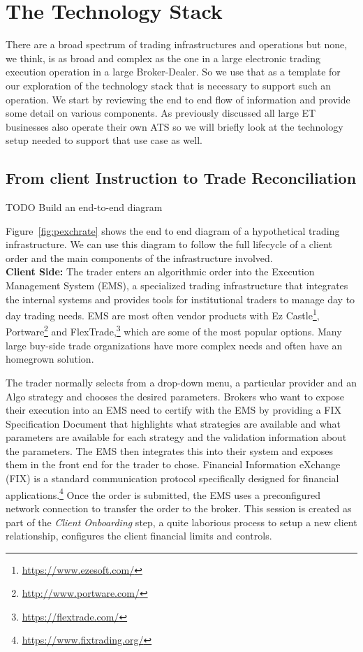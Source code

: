 \chapter{The Technology Stack\label{chap:ch_tech}}

There are a broad spectrum of trading infrastructures and operations but none, we think, is as broad and complex as the one in a large electronic trading execution operation in a large Broker-Dealer. So we use that as a template for our exploration of the technology stack that is necessary to support such an operation. We start by reviewing the end to end flow of information and provide some detail on various components. As previously discussed all large ET businesses also operate their own ATS so we will briefly look at the technology setup needed to support that use case as well.


\section{From client Instruction to Trade Reconciliation}

TODO Build an end-to-end diagram


Figure~\ref{fig:pexchrate} shows the end to end diagram of a hypothetical trading infrastructure. We can use this diagram to follow the full lifecycle of a client order and the main components of the infrastructure involved. \\


\noindent\textbf{Client Side:} The trader enters an algorithmic order into the Execution Management System (EMS), a specialized trading infrastructure that integrates the internal systems and provides tools for institutional traders to manage day to day trading needs. EMS are most often vendor products with Ez Castle\footnote{\url{https://www.ezesoft.com/}}, Portware\footnote{\url{http://www.portware.com/}} and FlexTrade,\footnote{\url{https://flextrade.com/}} which are some of the most popular options. Many large buy-side trade organizations have more complex needs and often have an homegrown solution.


The trader normally selects from a drop-down menu, a particular provider and an Algo strategy and  chooses the desired parameters. Brokers who want to expose their execution into an EMS need to certify with the EMS by providing a FIX Specification Document that highlights what strategies are available and what parameters are available for each strategy and the validation information about the parameters. The EMS then integrates this into their system and exposes them in the front end for the trader to chose. Financial Information eXchange (FIX) is a standard communication protocol specifically designed for financial applications.\footnote{\url{https://www.fixtrading.org/}} Once the order is submitted, the EMS uses a preconfigured network connection to transfer the order to the broker. This session is created as part of the \emph{Client Onboarding} step, a quite laborious process to setup a new client relationship, configures the client financial limits and controls. \\


